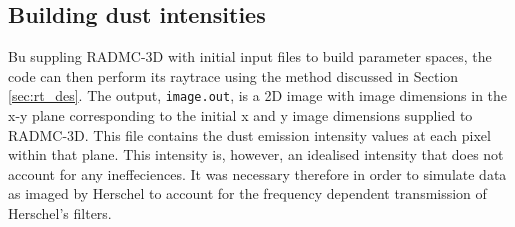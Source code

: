 \documentclass{report}
\begin{document}

\subsection{Building dust intensities}
Bu suppling RADMC-3D with initial input files to build parameter spaces, the code can then perform its raytrace using the method discussed in Section \ref{sec:rt_des}. The output, \texttt{image.out}, is a 2D image with image dimensions in the x-y plane corresponding to the initial x and y image dimensions supplied to RADMC-3D. This file contains the dust emission intensity values at each pixel within that plane. This intensity is, however, an idealised intensity that does not account for any ineffeciences. It was necessary therefore in order to simulate data as imaged by Herschel to account for the frequency dependent transmission of Herschel's filters.
\end{document}
